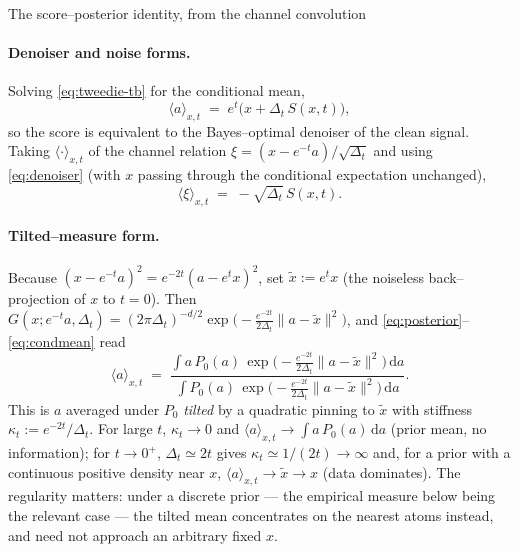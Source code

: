 \begin{toolbox}[tb:sm-tweedie]{The score--posterior identity, from the channel convolution}
\paragraph{Denoiser and noise forms.}
Solving \eqref{eq:tweedie-tb} for the conditional mean,
\begin{equation}
  \langle a\rangle_{x,t}\;=\;e^{t}\big(x+\Delta_t\,S(x,t)\big),
  \label{eq:denoiser}
\end{equation}
so the score is equivalent to the Bayes--optimal denoiser of the clean signal.
Taking $\langle\cdot\rangle_{x,t}$ of the channel relation $\xi=(x-e^{-t}a)/\sqrt{\Delta_t}$
and using \eqref{eq:denoiser} (with $x$ passing through the conditional expectation
unchanged),
\begin{equation}
  \langle \xi\rangle_{x,t}\;=\;-\sqrt{\Delta_t}\,S(x,t).
  \label{eq:noiseform}
\end{equation}

\paragraph{Tilted--measure form.}
Because $(x-e^{-t}a)^2=e^{-2t}(a-e^{t}x)^2$, set $\tilde x:=e^{t}x$ (the noiseless
back--projection of $x$ to $t=0$). Then
$G(x;e^{-t}a,\Delta_t)=(2\pi\Delta_t)^{-d/2}\exp\!\big(-\tfrac{e^{-2t}}{2\Delta_t}\lVert a-\tilde x\rVert^2\big)$,
and \eqref{eq:posterior}--\eqref{eq:condmean} read
\begin{equation}
  \langle a\rangle_{x,t}
  \;=\;\frac{\displaystyle\int a\,P_0(a)\,
        \exp\!\big(-\tfrac{e^{-2t}}{2\Delta_t}\lVert a-\tilde x\rVert^2\big)\,\mathrm da}
       {\displaystyle\int P_0(a)\,
        \exp\!\big(-\tfrac{e^{-2t}}{2\Delta_t}\lVert a-\tilde x\rVert^2\big)\,\mathrm da}.
  \label{eq:tilted}
\end{equation}
This is $a$ averaged under $P_0$ \emph{tilted} by a quadratic pinning to $\tilde x$ with
stiffness $\kappa_t:=e^{-2t}/\Delta_t$. For large $t$, $\kappa_t\to0$ and
$\langle a\rangle_{x,t}\to\int a\,P_0(a)\,\mathrm da$ (prior mean, no information); for
$t\to0^{+}$, $\Delta_t\simeq2t$ gives $\kappa_t\simeq1/(2t)\to\infty$ and,
for a prior with a continuous positive density near $x$,
$\langle a\rangle_{x,t}\to\tilde x\to x$ (data dominates). The regularity
matters: under a discrete prior --- the empirical measure below being the
relevant case --- the tilted mean concentrates on the nearest atoms instead,
and need not approach an arbitrary fixed $x$.


\end{toolbox}

